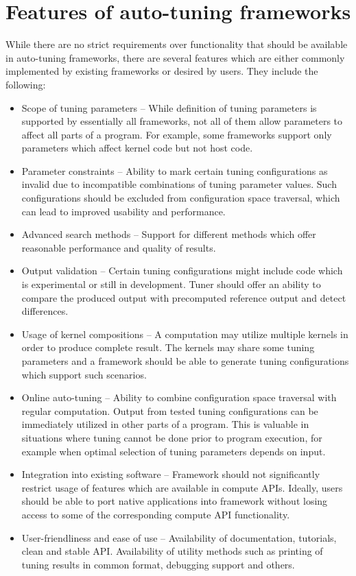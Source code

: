 \documentclass
[
    digital, %
    oneside, %
    table, %
    nolof, %
    nolot, %
    nocover %
]{fithesis3}
\begin{document}
\section{Features of auto-tuning frameworks}
While there are no strict requirements over functionality that should be available in auto-tuning frameworks, there are several features which are either
commonly implemented by existing frameworks or desired by users. They include the following: 
\begin{itemize}
    \item Scope of tuning parameters -- While definition of tuning parameters is supported by essentially all frameworks, not all of them allow parameters
    to affect all parts of a program. For example, some frameworks support only parameters which affect kernel code but not host code.
    \item Parameter constraints -- Ability to mark certain tuning configurations as invalid due to incompatible combinations of tuning parameter values.
    Such configurations should be excluded from configuration space traversal, which can lead to improved usability and performance.
    \item Advanced search methods -- Support for different methods which offer reasonable performance and quality of results.
    \item Output validation -- Certain tuning configurations might include code which is experimental or still in development. Tuner should offer
    an ability to compare the produced output with precomputed reference output and detect differences.
    \item Usage of kernel compositions -- A computation may utilize multiple kernels in order to produce complete result. The kernels may share some
    tuning parameters and a framework should be able to generate tuning configurations which support such scenarios.
    \item Online auto-tuning -- Ability to combine configuration space traversal with regular computation. Output from tested tuning configurations can
    be immediately utilized in other parts of a program. This is valuable in situations where tuning cannot be done prior to program execution, for
    example when optimal selection of tuning parameters depends on input.
    \item Integration into existing software -- Framework should not significantly restrict usage of features which are available in compute APIs.
    Ideally, users should be able to port native applications into framework without losing access to some of the corresponding compute API functionality.
    \item User-friendliness and ease of use -- Availability of documentation, tutorials, clean and stable API. Availability of utility methods such
    as printing of tuning results in common format, debugging support and others.
\end{itemize}
\end{document}

